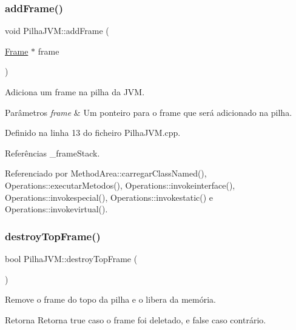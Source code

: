 \subsubsection{\texorpdfstring{add\+Frame()}{addFrame()}}
{\footnotesize\ttfamily void Pilha\+J\+V\+M\+::add\+Frame (\begin{DoxyParamCaption}\item[{\hyperlink{classFrame}{Frame} $\ast$}]{frame }\end{DoxyParamCaption})}



Adiciona um frame na pilha da J\+VM. 


\begin{DoxyParams}{Parâmetros}
{\em frame} & Um ponteiro para o frame que será adicionado na pilha. \\
\hline
\end{DoxyParams}


Definido na linha 13 do ficheiro Pilha\+J\+V\+M.\+cpp.



Referências \+\_\+frame\+Stack.



Referenciado por Method\+Area\+::carregar\+Class\+Named(), Operations\+::executar\+Metodos(), Operations\+::invokeinterface(), Operations\+::invokespecial(), Operations\+::invokestatic() e Operations\+::invokevirtual().

\mbox{\label{classPilhaJVM_a8ae0ed77b894fa95e73ea4077ebdeea2}} 
\subsubsection{\texorpdfstring{destroy\+Top\+Frame()}{destroyTopFrame()}}
{\footnotesize\ttfamily bool Pilha\+J\+V\+M\+::destroy\+Top\+Frame (\begin{DoxyParamCaption}{ }\end{DoxyParamCaption})}



Remove o frame do topo da pilha e o libera da memória. 

\begin{DoxyReturn}{Retorna}
Retorna {\ttfamily true} caso o frame foi deletado, e {\ttfamily false} caso contrário. 
\end{DoxyReturn}


